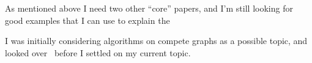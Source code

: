 \documentclass{sig-alternate}
\begin{document}
As mentioned above I need two other ``core'' papers, and I'm still looking for good examples that I can use to explain the 

I was initially considering algorithms on compete graphs as a possible topic, and looked over~\cite{winkler1984isometric, dobkin1987delaunay, folkman1970graphs} before I settled on my current topic.


  

\end{document}
